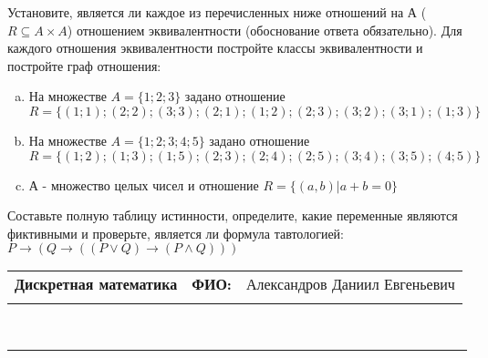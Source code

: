 \documentclass[10pt]{exam}
\newcommand{\class}{Дискретная математика}
\newcommand{\examdate}{}
\begin{document}
\begin{questions}
\question
Установите, является ли каждое из перечисленных ниже отношений на А ($R \subseteq A \times A$) отношением эквивалентности (обоснование ответа обязательно). Для каждого отношения эквивалентности постройте классы 
эквивалентности и постройте граф отношения:
\begin{enumerate} [a)]\setcounter{enumi}{0}
\item На множестве $A = \{1; 2; 3\}$ задано отношение $R = \{(1; 1); (2; 2); (3; 3); (2; 1); (1; 2); (2; 3); (3; 2); (3; 1); (1; 3)\}$
\item На множестве $A = \{1; 2; 3; 4; 5\}$ задано отношение $R = \{(1; 2); (1; 3); (1; 5); (2; 3); (2; 4); (2; 5); (3; 4); (3; 5); (4; 5)\}$
\item А - множество целых чисел и отношение $R = \{(a,b)|a + b = 0\}$
\end{enumerate}\question Составьте полную таблицу истинности, определите, какие переменные являются фиктивными и проверьте, является ли формула тавтологией:
$ P \rightarrow (Q \rightarrow ((P \lor Q) \rightarrow (P \land Q)))$

\end{questions}
\newpage
\begin{flushright}
\begin{tabular}{p{2.8in} r l}
\textbf{\class} & \textbf{ФИО:} &Александров Даниил Евгеньевич
\\

\textbf{\examdate} &&\\
\end{tabular}\\
\end{flushright}
\rule[1ex]{\textwidth}{.1pt}
\end{document}
